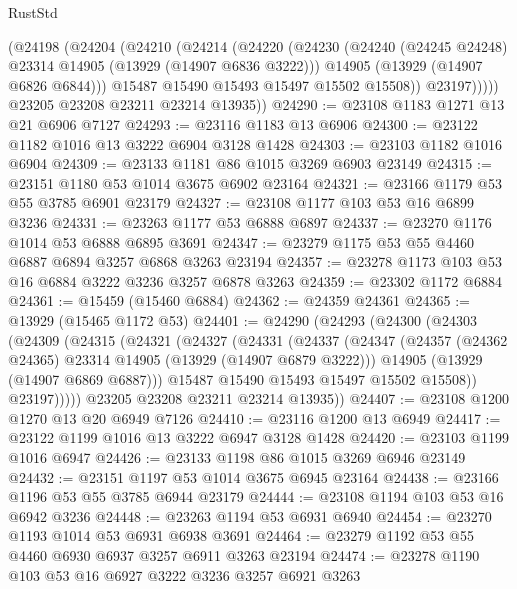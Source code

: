 \begin{lexlean}{RustStd}
\begin{coremodule}
            (@24198
              (@24204
                (@24210
                  (@24214
                    (@24220
                      (@24230
                        (@24240 (@24245 @24248) @23314 @14905 (@13929 (@14907 @6836 @3222)))
                        @14905
                        (@13929 (@14907 @6826 @6844)))
                      @15487
                      @15490
                      @15493
                      @15497
                      @15502
                      @15508))
                  @23197)))))
        @23205
        @23208
        @23211
        @23214
        @13935))
@24290 := @23108 @1183 @1271 @13 @21 @6906 @7127
@24293 := @23116 @1183 @13 @6906
@24300 := @23122 @1182 @1016 @13 @3222 @6904 @3128 @1428
@24303 := @23103 @1182 @1016 @6904
@24309 := @23133 @1181 @86 @1015 @3269 @6903 @23149
@24315 := @23151 @1180 @53 @1014 @3675 @6902 @23164
@24321 := @23166 @1179 @53 @55 @3785 @6901 @23179
@24327 := @23108 @1177 @103 @53 @16 @6899 @3236
@24331 := @23263 @1177 @53 @6888 @6897
@24337 := @23270 @1176 @1014 @53 @6888 @6895 @3691
@24347 := @23279 @1175 @53 @55 @4460 @6887 @6894 @3257 @6868 @3263 @23194
@24357 := @23278 @1173 @103 @53 @16 @6884 @3222 @3236 @3257 @6878 @3263
@24359 := @23302 @1172 @6884
@24361 := @15459 (@15460 @6884)
@24362 := @24359 @24361
@24365 := @13929 (@15465 @1172 @53)
@24401 := @24290
    (@24293
      (@24300
        (@24303
          (@24309
            (@24315
              (@24321
                (@24327
                  (@24331
                    (@24337
                      (@24347
                        (@24357 (@24362 @24365) @23314 @14905 (@13929 (@14907 @6879 @3222)))
                        @14905
                        (@13929 (@14907 @6869 @6887)))
                      @15487
                      @15490
                      @15493
                      @15497
                      @15502
                      @15508))
                  @23197)))))
        @23205
        @23208
        @23211
        @23214
        @13935))
@24407 := @23108 @1200 @1270 @13 @20 @6949 @7126
@24410 := @23116 @1200 @13 @6949
@24417 := @23122 @1199 @1016 @13 @3222 @6947 @3128 @1428
@24420 := @23103 @1199 @1016 @6947
@24426 := @23133 @1198 @86 @1015 @3269 @6946 @23149
@24432 := @23151 @1197 @53 @1014 @3675 @6945 @23164
@24438 := @23166 @1196 @53 @55 @3785 @6944 @23179
@24444 := @23108 @1194 @103 @53 @16 @6942 @3236
@24448 := @23263 @1194 @53 @6931 @6940
@24454 := @23270 @1193 @1014 @53 @6931 @6938 @3691
@24464 := @23279 @1192 @53 @55 @4460 @6930 @6937 @3257 @6911 @3263 @23194
@24474 := @23278 @1190 @103 @53 @16 @6927 @3222 @3236 @3257 @6921 @3263

\end{coremodule}
\end{lexlean}

